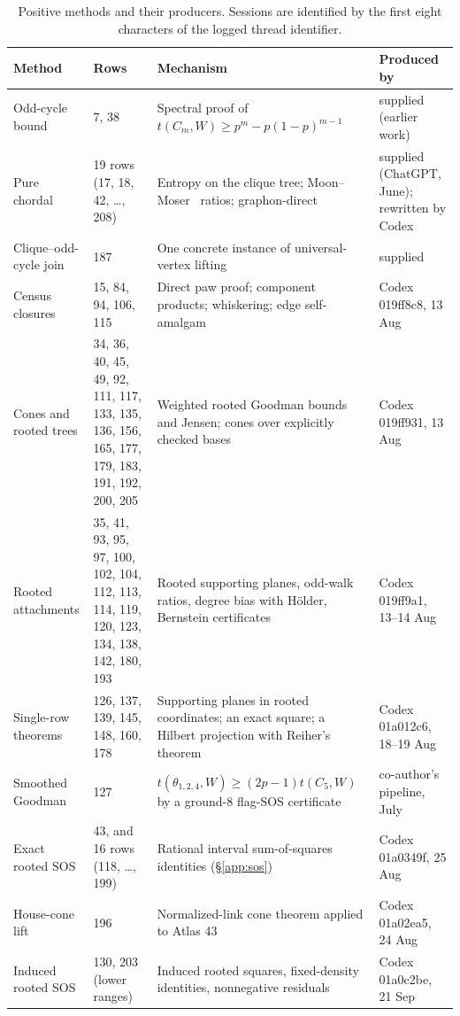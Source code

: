 \documentclass[11pt,a4paper]{article}
\newcommand{\pr}[1]{\textsf{#1}}   %
\begin{document}
\begin{table}[h]
\centering\small
\caption{Positive methods and their producers. Sessions are identified by the first eight characters of the
logged thread identifier.}
\label{tab:families}
\begin{tabularx}{\linewidth}{@{}P{3.6cm}P{4.2cm}YP{2.6cm}@{}}
\toprule
Method & Rows & Mechanism & Produced by\\ \midrule
Odd-cycle bound & 7, 38 & Spectral proof of $t(C_m,W)\ge p^m-p(1-p)^{m-1}$ & supplied (earlier work)\\
Pure chordal & 19 rows (17, 18, 42, \dots, 208) & Entropy on the clique tree; Moon--Moser~\cite{moonmoser1962} ratios; graphon-direct & supplied (ChatGPT, June); rewritten by Codex\\
Clique--odd-cycle join & 187 & One concrete instance of universal-vertex lifting & supplied\\
Census closures & 15, 84, 94, 106, 115 & Direct paw proof; component products; whiskering; edge self-amalgam & Codex \pr{019ff8c8}, 13 Aug\\
Cones and rooted trees & 34, 36, 40, 45, 49, 92, 111, 117, 133, 135, 136, 156, 165, 177, 179, 183, 191, 192, 200, 205 & Weighted rooted Goodman bounds and Jensen; cones over explicitly checked bases & Codex \pr{019ff931}, 13 Aug\\
Rooted attachments & 35, 41, 93, 95, 97, 100, 102, 104, 112, 113, 114, 119, 120, 123, 134, 138, 142, 180, 193 & Rooted supporting planes, odd-walk ratios, degree bias with H\"older, Bernstein certificates & Codex \pr{019ff9a1}, 13--14 Aug\\
Single-row theorems & 126, 137, 139, 145, 148, 160, 178 & Supporting planes in rooted coordinates; an exact square; a Hilbert projection with Reiher's theorem~\cite{reiher2016} & Codex \pr{01a012c6}, 18--19 Aug\\
Smoothed Goodman & 127 & $t(\theta_{1,2,4},W)\ge(2p-1)t(C_5,W)$ by a ground-8 flag-SOS certificate~\cite{razborov2007} & co-author's pipeline, July\\
Exact rooted SOS & 43, and 16 rows (118, \dots, 199) & Rational interval sum-of-squares identities (\S\ref{app:sos}) & Codex \pr{01a0349f}, 25 Aug\\
House-cone lift & 196 & Normalized-link cone theorem applied to Atlas 43 & Codex \pr{01a02ea5}, 24 Aug\\
Induced rooted SOS & 130, 203 (lower ranges) & Induced rooted squares, fixed-density identities, nonnegative residuals & Codex \pr{01a0c2be}, 21 Sep\\
\bottomrule
\end{tabularx}
\end{table}
\end{document}

